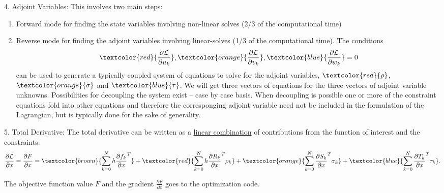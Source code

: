 \documentclass{beamer}
\newcommand{\pd}[2]{\frac{\partial #1}{\partial #2}}
\newenvironment{noheadline}{
    \setbeamertemplate{headline}{}
    \addtobeamertemplate{frametitle}{\vspace*{-1.5\baselineskip}}{}
}{}
\begin{document}
\begin{noheadline}
\begin{frame}[allowframebreaks]
{\begin{block}{4. Adjoint Variables:}
  This involves two main steps:
  \begin{enumerate}
  \item Forward mode for finding the state variables involving non-linear solves (2/3 of the
    computational time)
  \item Reverse mode for finding the adjoint variables involving
    linear-solves (1/3 of the computational time). The
    conditions $$\textcolor{red}{\pd{\cal{L}}{u_k}},
    \textcolor{orange}{\pd{\cal{L}}{v_k}},
    \textcolor{blue}{\pd{\cal{L}}{w_k}} = 0$$ can be used to generate
    a typically coupled system of equations to solve for the adjoint
    variables, $\textcolor{red}{\rho}$, $\textcolor{orange}{\sigma}$
    and $\textcolor{blue}{\tau}$. We will get three vectors of
    equations for the three vectors of adjoint variable
    unknowns. Possibilities for decoupling the system exist -- case by
    case basis. When decoupling is possible one or more of the
    constraint equations fold into other equations and therefore the
    corresponging adjoint variable need not be included in the
    formulation of the Lagrangian, but is typically done for the sake
    of generality.
  \end{enumerate}
\end{block}

  \begin{block}{5. Total Derivative:}
    The total derivative can be
    written as a \underline{linear combination} of contributions from the function
    of interest and the constraints:
    \begin{equation}\label{eqn:nbg-total-derivative}
      \pd{\cal{L}}{x} = \pd{F}{x} = 
      \textcolor{brown}{\sum_{k=0}^N h \pd{f_k}{x}^T} + 
      \textcolor{red}{\sum_{k=0}^N h \pd{R_k}{x}^T \rho_k} + 
      \textcolor{orange}{\sum_{k=0}^N \pd{S_k}{x}^T \sigma_k} + 
      \textcolor{blue}{\sum_{k=0}^N \pd{T_k}{x}^T \tau_k}.
    \end{equation}
  \end{block}
  The objective function value $F$ and the gradient $\pd{F}{x}$ goes
  to the optimization code.

  \framebreak

}
\end{frame}
\end{noheadline}
\end{document}
